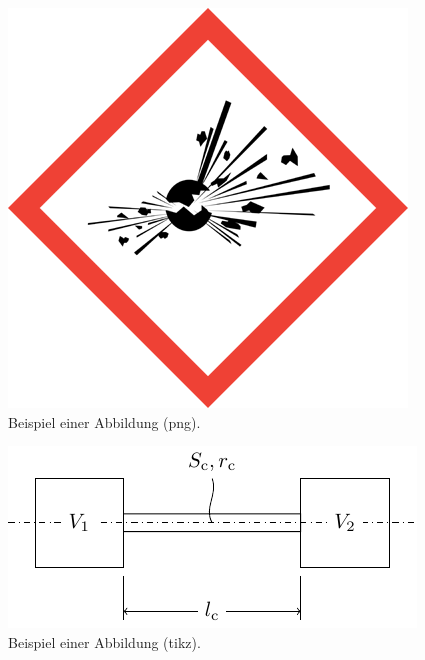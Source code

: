 \begin{figure}%
  \centering
  \includegraphics[scale=.3]{figures/GHS01}
  \caption{Beispiel einer Abbildung (png).}
  \label{fig:GHS01}
\end{figure}

\begin{figure}%
  \centering
  \includegraphics{figures/pas_zelle}
  \caption{Beispiel einer Abbildung (tikz).}
  \label{fig:PasZelle}
\end{figure}


